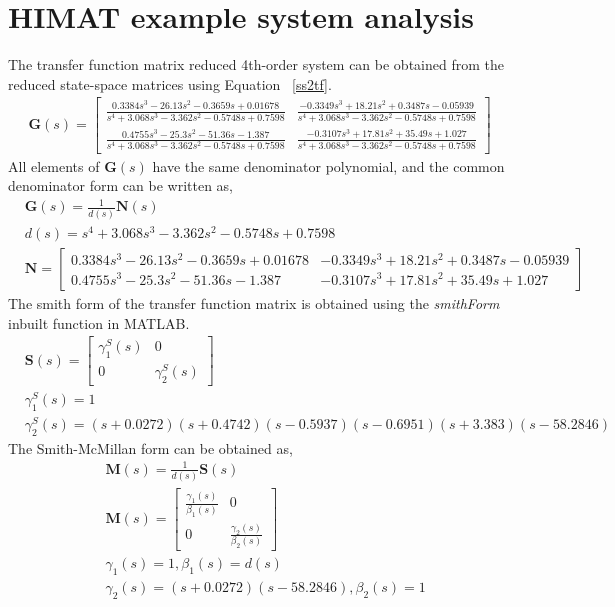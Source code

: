 \section{HIMAT example system analysis}
The transfer function matrix reduced 4th-order system can be obtained from the reduced state-space matrices using Equation ~\eqref{ss2tf}.
\begin{align*}
    \bm{G}(s) =
    \begin{bmatrix}
        \frac{0.3384 s^3 - 26.13 s^2 - 0.3659 s + 0.01678}{s^4 + 3.068 s^3 - 3.362 s^2 - 0.5748 s + 0.7598} & \frac{-0.3349 s^3 + 18.21 s^2 + 0.3487 s - 0.05939}{s^4 + 3.068 s^3 - 3.362 s^2 - 0.5748 s + 0.7598}\\
        \frac{0.4755 s^3 - 25.3 s^2 - 51.36 s - 1.387}{s^4 + 3.068 s^3 - 3.362 s^2 - 0.5748 s + 0.7598} & \frac{-0.3107 s^3 + 17.81 s^2 + 35.49 s + 1.027}{s^4 + 3.068 s^3 - 3.362 s^2 - 0.5748 s + 0.7598}   
    \end{bmatrix}
\end{align*}
All elements of $\mathbf{G}(s)$ have the same denominator polynomial, and the common denominator form can be written as,
\begin{align*}
    &\bm{G}(s) = \frac{1}{d(s)}\bm{N}(s)\\
    &d(s) = s^4 + 3.068 s^3 - 3.362 s^2 - 0.5748 s + 0.7598\\
    &\bm{N} = 
    \begin{bmatrix}
        0.3384 s^3 - 26.13 s^2 - 0.3659 s + 0.01678 & -0.3349 s^3 + 18.21 s^2 + 0.3487 s - 0.05939\\
        0.4755 s^3 - 25.3 s^2 - 51.36 s - 1.387 & -0.3107 s^3 + 17.81 s^2 + 35.49 s + 1.027   
    \end{bmatrix}
\end{align*}
The smith form of the transfer function matrix is obtained using the \emph{smithForm} inbuilt function in MATLAB.
\begin{align*}
    &\bm{S}(s) =
    \begin{bmatrix}
        \gamma^S_1(s)&0\\
        0&\gamma^S_2(s)
    \end{bmatrix}\\
    &\gamma^S_1(s) = 1\\
    &\gamma^S_2(s) = (s+0.0272)(s+0.4742)(s-0.5937)(s-0.6951)(s+3.383)(s-58.2846)
\end{align*}
The Smith-McMillan form can be obtained as,
\begin{align*}
    &\bm{M}(s) = \frac{1}{d(s)}\bm{S}(s)\\
    &\bm{M}(s) =
    \begin{bmatrix}
        \frac{\gamma_1(s)}{\beta_1(s)} &0\\
        0&\frac{\gamma_2(s)}{\beta_2(s)}
    \end{bmatrix}\\
    &\gamma_1(s) = 1, \beta_1(s) = d(s)\\
    &\gamma_2(s) = (s+0.0272)(s-58.2846), \beta_2(s) = 1
\end{align*}

